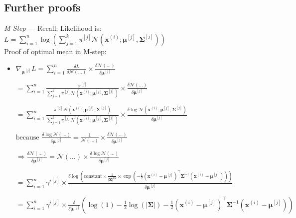 \subsection*{Further proofs}
\emph{M Step} ---
Recall: Likelihood is:
$
L = \sum_{i=1}^n \log \left( \sum_{j=1}^k \pi^{[j]} \mathcal{N}\left( \boldsymbol{x}^{(i)}; \boldsymbol{\mu}^{[j]}, \boldsymbol{\Sigma}^{[j]} \right) \right)
$\\
Proof of optimal mean in M-step:
\begin{itemize}
    \item $ \nabla_{\boldsymbol{\mu}^{[j]}} L = \sum_{i=1}^n \frac{\delta L}{\delta \mathcal{N}(\ldots)} \times \frac{\delta \mathcal{N}(\ldots)}{\delta \boldsymbol{\mu}^{[j]}}
    $

    $
    = \sum_{i=1}^n \frac{\pi^{[j]}}{\sum_{j=1}^k \pi^{[j]} \mathcal{N}\left( \boldsymbol{x}^{(i)}; \boldsymbol{\mu}^{[j]}, \boldsymbol{\Sigma}^{[j]} \right)} \times \frac{\delta \mathcal{N}(\ldots)}{\delta \boldsymbol{\mu}^{[j]}}
    $

    $
    = \sum_{i=1}^n \frac{\pi^{[j]} \mathcal{N}\left( \boldsymbol{x}^{(i)}; \boldsymbol{\mu}^{[j]}, \boldsymbol{\Sigma}^{[j]} \right)}{\sum_{j=1}^k \pi^{[j]} \mathcal{N}\left( \boldsymbol{x}^{(i)}; \boldsymbol{\mu}^{[j]}, \boldsymbol{\Sigma}^{[j]} \right)} \times \frac{\delta \log \mathcal{N}\left( \boldsymbol{x}^{(i)}; \boldsymbol{\mu}^{[j]}, \boldsymbol{\Sigma}^{[j]} \right)}{\delta \boldsymbol{\mu}^{[j]}}
    $ 

    $
    \text{because } \frac{\delta \log \mathcal{N}(\ldots)}{\delta \boldsymbol{\mu}^{[j]}} = \frac{1}{\mathcal{N}(\ldots)} \times \frac{\delta \mathcal{N}(\ldots)}{\delta \boldsymbol{\mu}^{[j]}}
    $

    $
    \Rightarrow \frac{\delta \mathcal{N}(\ldots)}{\delta \boldsymbol{\mu}^{[j]}} = \mathcal{N}(\ldots) \times \frac{\delta \log \mathcal{N}(\ldots)}{\delta \boldsymbol{\mu}^{[j]}}
    $

    $
    = \sum_{i=1}^n \gamma^{i[j]} \times \frac{\delta \log \left(\text{constant} \times \frac{1}{|\boldsymbol{\Sigma}|^{1|2}} \times \exp\left(-\frac{1}{2} (\boldsymbol{x}^{(i)} - \boldsymbol{\mu}^{[j]})^\intercal \boldsymbol{\Sigma}^{-1} (\boldsymbol{x}^{(i)} - \boldsymbol{\mu}^{[j]}) \right)\right)}{\delta \boldsymbol{\mu}^{[j]}}
    $

    $
    = \sum_{i=1}^n \gamma^{i[j]} \times \frac{\delta}{\delta \boldsymbol{\mu}^{[j]}} \left( \log(1) - \frac{1}{2} \log(|\boldsymbol{\Sigma}|) - \frac{1}{2} (\boldsymbol{x}^{(i)} - \boldsymbol{\mu}^{[j]})^\intercal \boldsymbol{\Sigma}^{-1} (\boldsymbol{x}^{(i)} - \boldsymbol{\mu}^{[j]}) \right)
    $


\end{itemize}
